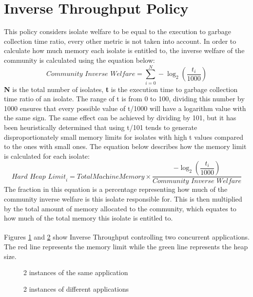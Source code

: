 \documentclass{l4proj}
\begin{document}
\section{Inverse Throughput Policy}
This policy considers isolate welfare to be equal to the execution to garbage collection time ratio, every other metric is not taken into account. In order to calculate how much memory each isolate is entitled to, the inverse welfare of the community is calculated using the equation below:  
\begin{equation}
\textit{Community Inverse Welfare} = \sum_{i=0}^{N} -\log_2\left(\dfrac{t_i}{1000}\right)
\end{equation}
\textbf{N} is the total number of isolates, \textbf{t} is the execution time to garbage collection time ratio of an isolate. The range of t is from 0 to 100, dividing this number by 1000 ensures that every possible value of t/1000 will have a logarithm value with the same sign. The same effect can be achieved by dividing by 101, but it has been heuristically determined that using t/101 tends to generate disproportionately small memory limits for isolates with high t values compared to the ones with small ones. The equation below describes how the memory limit is calculated for each isolate:
\begin{equation}
\textit{Hard Heap Limit}_i = \textit{TotalMachineMemory} \times \frac{-\log_2\left(\dfrac{t_i}{1000}\right)}{\textit{Community Inverse Welfare}}
\end{equation}
The fraction in this equation is a percentage representing how much of the community inverse welfare is this isolate responsible for. This is then multiplied by the total amount of memory allocated to the community, which equates to how much of the total memory this isolate is entitled to.
\\\\
Figures \ref{invtp_eq} and \ref{invtp_df} show Inverse Throughput controlling two concurrent applications. The red line represents the memory limit while the green line represents the heap size.
\begin{figure}[!ht]
\caption{2 instances of the same application}
\label{invtp_eq}
\end{figure}
\begin{figure}[!ht]
\caption{2 instances of different applications}
\label{invtp_df}
\end{figure}
\end{document}
